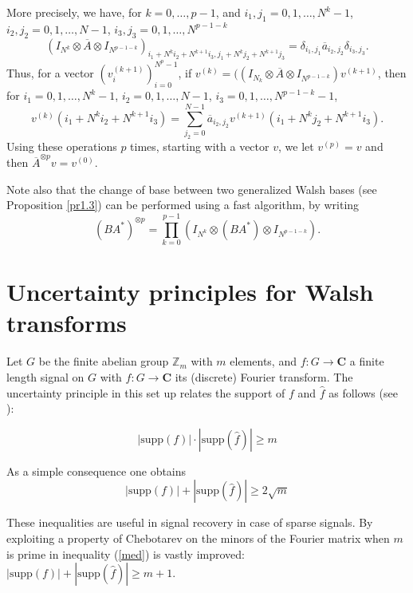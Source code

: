 \documentclass[11pt]{amsart}
\theoremstyle{definition}
\theoremstyle{remark}
\numberwithin{equation}{section}
\newcommand{\cj}[1]{\overline{#1}}
\newcommand{\bz}{\mathbb{Z}}
\begin{document}
More precisely, we have, for $k=0,\dots,p-1$, and $i_1,j_1=0,1,\dots, N^k-1$, $i_2,j_2=0,1,\dots,N-1$, $i_3,j_3=0,1,\dots,N^{p-1-k}$
$$(I_{N^k}\otimes\cj A\otimes I_{N^{p-1-k}})_{i_1+N^ki_2+N^{k+1}i_3, j_1+N^kj_2+N^{k+1}j_3}=\delta_{i_1,j_1}\cj a_{i_2,j_2}\delta_{i_3,j_3}.$$
Thus, for a vector  $(v^{(k+1)}_i)_{i=0}^{N^p-1}$, if $v^{(k)}=((I_{N_k}\otimes\cj A\otimes I_{N^{p-1-k}})v^{(k+1)}$, then for $i_1=0,1,\dots,N^k-1$, $i_2=0,1,\dots, N-1$, $i_3=0,1,\dots,N^{p-1-k}-1$,
$$v^{(k)}(i_1+N^ki_2+N^{k+1}i_3)=\sum_{j_2=0}^{N-1}\cj a_{i_2,j_2}v^{(k+1)}(i_1+N^kj_2+N^{k+1}i_3).$$
Using these operations $p$ times, starting with a vector $v$, we let $v^{(p)}=v$ and then $\cj A^{\otimes p}v=v^{(0)}$.


Note also that the change of base between two generalized Walsh bases (see Proposition \ref{pr1.3}) can be performed using a fast algorithm, by writing
$$(BA^*)^{\otimes p}=\prod_{k=0}^{p-1}\left(I_{N^k}\otimes (BA^*)\otimes I_{N^{p-1-k}}\right).$$





\section{Uncertainty principles for Walsh transforms}\label{incert}
Let $G $ be the finite abelian group $\bz_m$ with $m$ elements,  and  $f:G\rightarrow \mathbf{C}$ a finite length signal on $G$ with $\hat{f}:G\to\mathbf{C}$ its (discrete) Fourier transform.  The uncertainty principle in this set up relates the support of $f$ and $\hat{f}$ as follows (see \cite{DoSt}):

\begin{equation}\label{unc}
|\text{supp}(f)|\cdot |\text{supp}(\hat{f})|\geq m
\end{equation}

As a simple consequence one obtains
\begin{equation}\label{med}
  |\text{supp}(f)| + |\text{supp}(\hat{f})|\geq 2\sqrt{ m}
\end{equation}

These inequalities are useful in signal recovery in case of sparse signals.  By exploiting a property of Chebotarev on the minors of the Fourier matrix when $m$ is prime in \cite{Taounc} inequality (\ref{med}) is vastly improved:  $|\text{supp}(f)| + |\text{supp}(\hat{f})|\geq  m+1 $.
\end{document}
